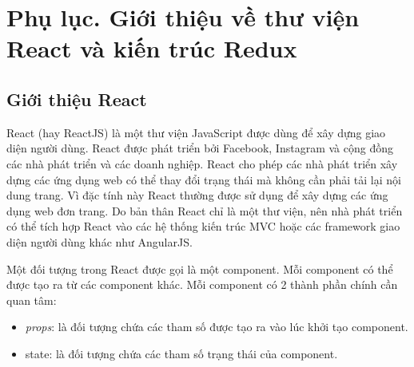 
\chapter*{Phụ lục. Giới thiệu về thư viện React và kiến trúc Redux}

\section*{Giới thiệu React}
React (hay ReactJS) là một thư viện JavaScript được dùng để xây dựng giao diện người dùng. React được phát triển bởi Facebook, Instagram và cộng đồng các nhà phát triển và các doanh nghiệp. React cho phép các nhà phát triển xây dựng các ứng dụng web có thể thay đổi trạng thái mà không cần phải tải lại nội dung trang. Vì đặc tính này React thường được sử dụng để xây dựng các ứng dụng web đơn trang. Do bản thân React chỉ là một thư viện, nên nhà phát triển có thể tích hợp React vào các hệ thống kiến trúc MVC hoặc các framework giao diện người dùng khác như AngularJS.

Một đối tượng trong React được gọi là một component. Mỗi component có thể được tạo ra từ các component khác. Mỗi component có 2 thành phần chính cần quan tâm:
\begin{itemize}
  \item \textit{props}: là đối tượng chứa các tham số được tạo ra vào lúc khởi tạo component.
  \item state: là đối tượng chứa các tham số trạng thái của component.
\end{itemize}

